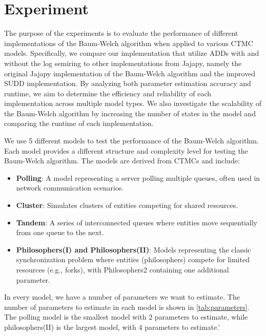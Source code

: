 \section{Experiment}\label{sec:experiment}

The purpose of the experiments is to evaluate the performance of different implementations of the Baum-Welch algorithm when applied to various CTMC models. Specifically, we compare our implementation that utilize ADDs with and without the log semiring to other implementations from Jajapy, namely the original Jajapy implementation of the Baum-Welch algorithm and the improved SUDD implementation. By analyzing both parameter estimation accuracy and runtime, we aim to determine the efficiency and reliability of each implementation across multiple model types.
We also investigate the scalability of the Baum-Welch algorithm by increasing the number of states in the model and comparing the runtime of each implementation.

We use 5 different models to test the performance of the Baum-Welch algorithm.
Each model provides a different structure and complexity level for testing the Baum-Welch algorithm. The models are derived from CTMCs and include:
\begin{itemize}
    \item \textbf{Polling}: A model representing a server polling multiple queues, often used in network communication scenarios.
    \item \textbf{Cluster}: Simulates clusters of entities competing for shared resources.
    \item \textbf{Tandem}: A series of interconnected queues where entities move sequentially from one queue to the next.
    \item \textbf{Philosophers(I) and Philosophers(II)}: Models representing the classic synchronization problem where entities (philosophers) compete for limited resources (e.g., forks), with Philosophers2 containing one additional parameter.
\end{itemize}

In every model, we have a number of parameters we want to estimate. 
The number of parameters to estimate in each model is shown in \autoref{tab:parameters}.
The polling model is the smallest model with 2 parameters to estimate, while philosophers(II) is the largest model, with 4 parameters to estimate.'

